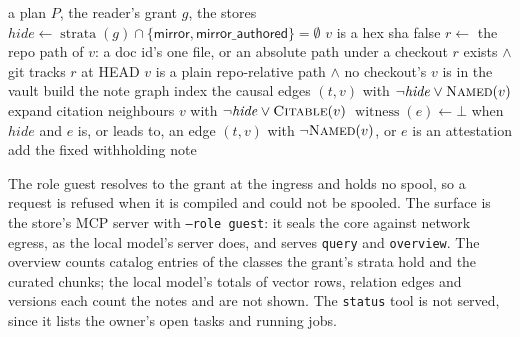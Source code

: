 \documentclass[11pt]{article}
\theoremstyle{plain}
\theoremstyle{definition}
\theoremstyle{remark}
\newcommand{\str}[1]{\textsf{#1}}
\begin{document}
\begin{algorithm}
\caption{Withholding the mirror from a reader whose grant does not name it.}\label{alg:hide}
\begin{algorithmic}[1]
\Require a plan $P$, the reader's grant $g$, the stores
\State $\mathit{hide} \gets \operatorname{strata}(g) \cap \{\str{mirror}, \str{mirror\_authored}\} = \emptyset$
 
   \Return $v$ is a hex sha \EndIf
   \Return false \EndIf
  \State $r \gets$ the repo path of $v$: a doc id's one file, or an absolute path under a checkout
  \State \Return $r$ exists $\wedge$ git tracks $r$ at HEAD
\EndFunction
{}
  \State \Return $v$ is a plain repo-relative path $\wedge$ no checkout's $v$ is in the vault
\EndFunction
{} build the note graph 
\EndIf
\State index the causal edges $(t, v)$ with $\neg\mathit{hide} \vee \Call{Named}{v}$ 
\State expand citation neighbours $v$ with $\neg\mathit{hide} \vee \Call{Citable}{v}$
\State $\operatorname{witness}(e) \gets \bot$ when $\mathit{hide}$ and $e$ is, or leads to, an edge $(t, v)$ with $\neg\Call{Named}{v}$, or $e$ is an attestation
 add the fixed withholding note \EndIf
\end{algorithmic}
\end{algorithm}

The role \str{guest} resolves to the grant at the ingress and holds no spool, so a request is
refused when it is compiled and could not be spooled. The surface is the store's MCP server with
\texttt{--role guest}: it seals the core against network egress, as the local model's server
does, and serves \texttt{query} and \texttt{overview}. The overview counts catalog entries of the
classes the grant's strata hold and the curated chunks; the local model's totals of vector rows,
relation edges and versions each count the notes and are not shown. The \texttt{status} tool is not
served, since it lists the owner's open tasks and running jobs.
\end{document}
